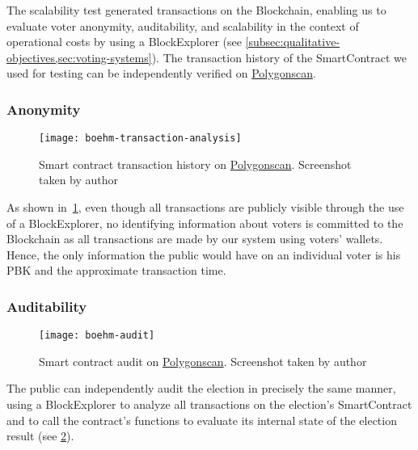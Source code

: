 The scalability test generated transactions on the \gls{Blockchain}, enabling us to evaluate voter anonymity, auditability, and scalability in the context of operational costs by using a \gls{BlockExplorer} (see \cref{subsec:qualitative-objectives,sec:voting-systems}).
The transaction history of the \gls{SmartContract} we used for testing can be independently verified on \href{https://mumbai.polygonscan.com/address/0x626aec8b9220bee641bc4098fa73f8cc55e50a8f}{Polygonscan}.

\subsubsection{Anonymity}

\begin{figure}[h]
    \centering
    \texttt{[image: boehm-transaction-analysis]}
    \caption[Smart contract transaction history]{Smart contract transaction history on \href{https://mumbai.polygonscan.com/address/0x626aec8b9220bee641bc4098fa73f8cc55e50a8f}{Polygonscan}. Screenshot taken by author}
    \label{fig:transaction-analysis}
\end{figure}

As shown in~\cref{fig:transaction-analysis}, even though all transactions are publicly visible through the use of a \gls{BlockExplorer}, no identifying information about voters is committed to the \gls{Blockchain} as all transactions are made by our system using voters' wallets.
Hence, the only information the public would have on an individual voter is his \gls{PBK} and the approximate transaction time.

\subsubsection{Auditability}

\begin{figure}[h]
    \centering
    \texttt{[image: boehm-audit]}
    \caption[Smart contract audit]{Smart contract audit on \href{https://mumbai.polygonscan.com/address/0x626aec8b9220bee641bc4098fa73f8cc55e50a8f}{Polygonscan}. Screenshot taken by author}
    \label{fig:audit}
\end{figure}

The public can independently audit the election in precisely the same manner, using a \gls{BlockExplorer} to analyze all transactions on the election’s \gls{SmartContract} and to call the contract’s functions to evaluate its internal state of the election result (see \cref{fig:audit}).

